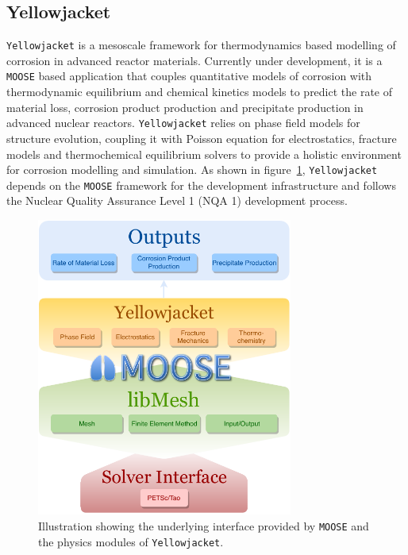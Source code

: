 	\subsection{Yellowjacket}	
	\texttt{Yellowjacket} is a mesoscale framework for thermodynamics based modelling of corrosion in advanced reactor materials. Currently under development, it is a \texttt{MOOSE} based application that couples quantitative models of corrosion with thermodynamic equilibrium and chemical kinetics models to predict the rate of material loss, corrosion product production and precipitate production in advanced nuclear reactors. \texttt{Yellowjacket} relies on phase field models for structure evolution, coupling it with Poisson equation for electrostatics, fracture models and thermochemical equilibrium solvers to provide a holistic environment for corrosion modelling and simulation. As shown in figure~\ref{fig:yjmoose}, \texttt{Yellowjacket} depends on the \texttt{MOOSE} framework for the development infrastructure and follows the Nuclear Quality Assurance Level 1 (NQA 1) \cite{NQA-web-page} development process. 
	
	\begin{figure}[htbp]
		\centering
		\includegraphics[width=0.75\textwidth]{figures/Yellowjacket_MOOSE.pdf}
		\caption{Illustration showing the underlying interface provided by \texttt{MOOSE} and the physics modules of \texttt{Yellowjacket}.}
		\label{fig:yjmoose}
	\end{figure}
	
